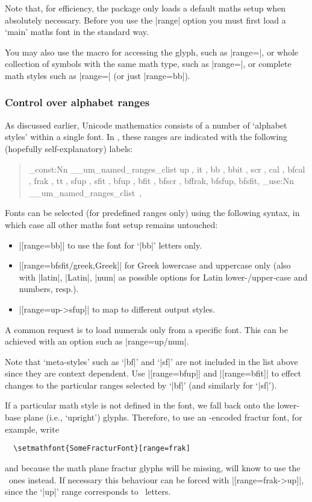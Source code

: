 Note that, for efficiency, the  package only loads a default maths setup when absolutely necessary.
Before you use the |range| option you must first load a `main' maths font in the standard way.

You may also use the macro for accessing the glyph, such as |range=|, or whole collection of symbols with the same math type, such as |range=\mathopen|, or complete math styles such as |range=\symbb| (or just |range=bb|).

\subsubsection{Control over alphabet ranges}

As discussed earlier, Unicode mathematics consists of a number of `alphabet styles' within a single font. In , these ranges are indicated with the following (hopefully self-explanatory) labels:
\begin{quote}\ttfamily
\ExplSyntaxOn
\clist_const:Nn \g__um_named_ranges_clist {
up    ,
it    ,
bb    ,
bbit  ,
scr   ,
cal   ,
bfcal ,
frak  ,
tt    ,
sfup  ,
sfit  ,
bfup  ,
bfit  ,
bfscr ,
bffrak,
bfsfup,
bfsfit,
}
\clist_use:Nn \g__um_named_ranges_clist {\,,\,~}
\ExplSyntaxOff
\end{quote}
Fonts can be selected (for predefined ranges only) using the following syntax, in which case all other maths font setup remains untouched:
\begin{itemize}
\item |[range=bb]| to use the font for `|bb|' letters only.
\item |[range=bfsfit/{greek,Greek}]| for Greek lowercase and uppercase only (also with |latin|, |Latin|, |num| as possible options for Latin lower-/upper-case and numbers, resp.).
\item |[range=up->sfup]| to map to different output styles.
\end{itemize}

A common request is to load numerals only from a specific font. This can be
achieved with an option such as |range=up/{num}|.

Note that `meta-styles' such as `|bf|' and `|sf|' are not included in the list above since they are context dependent. Use |[range=bfup]| and |[range=bfit]| to effect changes to the particular ranges selected by `|bf|' (and similarly for `|sf|').

If a particular math style is not defined in the font, we fall back onto the lower-base plane (i.e., `upright') glyphs.
Therefore, to use an \ascii-encoded fractur font, for example, write
\begin{Verbatim}
  \setmathfont{SomeFracturFont}[range=frak]
\end{Verbatim}
and because the math plane fractur glyphs will be missing,  will know to use the \ascii\ ones instead.
If necessary this behaviour can be forced with |[range=frak->up]|, since the `|up|' range corresponds to \ascii\ letters.

